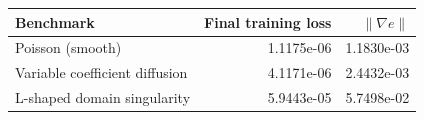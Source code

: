 \begin{tabular}{lrr}
\toprule
Benchmark & Final training loss & $\|\nabla e\|$ \\
\midrule
Poisson (smooth) & 1.1175e-06 & 1.1830e-03 \\
Variable coefficient diffusion & 4.1171e-06 & 2.4432e-03 \\
L-shaped domain singularity & 5.9443e-05 & 5.7498e-02 \\
\bottomrule
\end{tabular}
